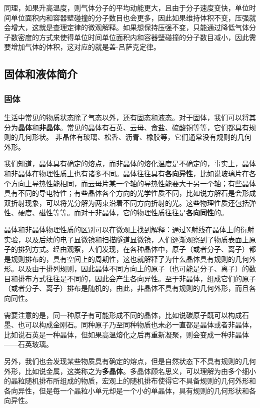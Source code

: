  同理，如果升高温度，则气体分子的平均动能更大，且由于分子速度变快，单位时间单位面积内和容器壁碰撞的分子数目也会更多，因此如果维持体积不变，压强就会增大，这就是查理定律的微观解释。如果想保持压强不变，只能通过降低气体分子数密度的方式来使得单位时间单位面积内和容器壁碰撞的分子数目减小，因此需要增加气体的体积，这对应的就是盖-吕萨克定律。
\subsection{固体和液体简介}
\subsubsection{固体}
生活中常见的物质状态除了气态以外，还有固态和液态。对于固体，我们可以将其分为\textbf{晶体}和\textbf{非晶体}。常见的晶体有石英、云母、食盐、硫酸铜等等，它们都具有规则的几何形状。
非晶体有玻璃、松香、沥青、橡胶等，它们通常没有规则的几何外形。

我们知道，晶体具有确定的熔点，而非晶体的熔化温度是不确定的，事实上，晶体和非晶体在物理性质上也有诸多不同。晶体往往具有\textbf{各向异性}，比如说玻璃片在各个方向上导热性能相同，而云母片某一个轴的导热性能要大于另一个轴；有些晶体具有不同的导电特性；有些晶体各个方向的光学性质不同，比如说方解石是会形成双折射现象，可以将光分解为两束沿着不同方向折射的光。这些物理性质还包括弹性、硬度、磁性等等。而对于非晶体，它的物理性质往往是\textbf{各向同性}的。

晶体和非晶体物理性质的区别可以在微观上找到解释：通过X射线在晶体上的衍射实验，以及后续的电子显微镜和扫描隧道显微镜，人们逐渐观察到了物质表面上原子的排列方式。经由观察，人们发现，在各种晶体中，原子（或者分子、离子）都是规则排布的，具有空间上的周期性，这也就解释了为什么晶体具有规则的几何外形。以及由于排列规则，因此晶体不同方向上的原子（也可能是分子、离子）的数目和排布方式往往是不同的，因此会产生各向异性。至于非晶体，组成它们的原子（或者分子、离子）排布是随机的，由此，非晶体不具有规则的几何外形，而且各向同性。

需要注意的是，同一种原子有可能形成不同的晶体，比如说碳原子既可以构成石墨、也可以构成金刚石。同种原子乃至同种物质也未必一直都是晶体或者非晶体，比如说石英是一种晶体，但如果高温熔化之后再重新凝聚，则会变成一种非晶体——石英玻璃。

另外，我们也会发现某些物质具有确定的熔点，但是自然状态下不具有规则的几何外形，比如说金属，这类称之为\textbf{多晶体}。多晶体顾名思义，可以理解为由多个细小的晶粒随机排布所组成的物质，宏观上的随机排布使得它不具备规则的几何外形和各向异性，但是每一个晶粒小单元却是一个小的单晶体，具有规则的几何形状和各向异性。


